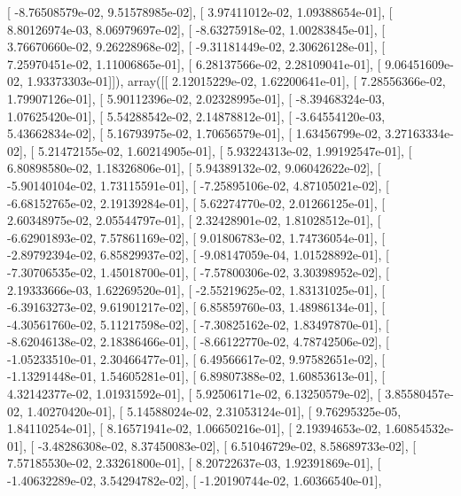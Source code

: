 \documentclass{article}
\begin{document}
       [ -8.76508579e-02,   9.51578985e-02],
       [  3.97411012e-02,   1.09388654e-01],
       [  8.80126974e-03,   8.06979697e-02],
       [ -8.63275918e-02,   1.00283845e-01],
       [  3.76670660e-02,   9.26228968e-02],
       [ -9.31181449e-02,   2.30626128e-01],
       [  7.25970451e-02,   1.11006865e-01],
       [  6.28137566e-02,   2.28109041e-01],
       [  9.06451609e-02,   1.93373303e-01]]), array([[  2.12015229e-02,   1.62200641e-01],
       [  7.28556366e-02,   1.79907126e-01],
       [  5.90112396e-02,   2.02328995e-01],
       [ -8.39468324e-03,   1.07625420e-01],
       [  5.54288542e-02,   2.14878812e-01],
       [ -3.64554120e-03,   5.43662834e-02],
       [  5.16793975e-02,   1.70656579e-01],
       [  1.63456799e-02,   3.27163334e-02],
       [  5.21472155e-02,   1.60214905e-01],
       [  5.93224313e-02,   1.99192547e-01],
       [  6.80898580e-02,   1.18326806e-01],
       [  5.94389132e-02,   9.06042622e-02],
       [ -5.90140104e-02,   1.73115591e-01],
       [ -7.25895106e-02,   4.87105021e-02],
       [ -6.68152765e-02,   2.19139284e-01],
       [  5.62274770e-02,   2.01266125e-01],
       [  2.60348975e-02,   2.05544797e-01],
       [  2.32428901e-02,   1.81028512e-01],
       [ -6.62901893e-02,   7.57861169e-02],
       [  9.01806783e-02,   1.74736054e-01],
       [ -2.89792394e-02,   6.85829937e-02],
       [ -9.08147059e-04,   1.01528892e-01],
       [ -7.30706535e-02,   1.45018700e-01],
       [ -7.57800306e-02,   3.30398952e-02],
       [  2.19333666e-03,   1.62269520e-01],
       [ -2.55219625e-02,   1.83131025e-01],
       [ -6.39163273e-02,   9.61901217e-02],
       [  6.85859760e-03,   1.48986134e-01],
       [ -4.30561760e-02,   5.11217598e-02],
       [ -7.30825162e-02,   1.83497870e-01],
       [ -8.62046138e-02,   2.18386466e-01],
       [ -8.66122770e-02,   4.78742506e-02],
       [ -1.05233510e-01,   2.30466477e-01],
       [  6.49566617e-02,   9.97582651e-02],
       [ -1.13291448e-01,   1.54605281e-01],
       [  6.89807388e-02,   1.60853613e-01],
       [  4.32142377e-02,   1.01931592e-01],
       [  5.92506171e-02,   6.13250579e-02],
       [  3.85580457e-02,   1.40270420e-01],
       [  5.14588024e-02,   2.31053124e-01],
       [  9.76295325e-05,   1.84110254e-01],
       [  8.16571941e-02,   1.06650216e-01],
       [  2.19394653e-02,   1.60854532e-01],
       [ -3.48286308e-02,   8.37450083e-02],
       [  6.51046729e-02,   8.58689733e-02],
       [  7.57185530e-02,   2.33261800e-01],
       [  8.20722637e-03,   1.92391869e-01],
       [ -1.40632289e-02,   3.54294782e-02],
       [ -1.20190744e-02,   1.60366540e-01],
\end{document}
